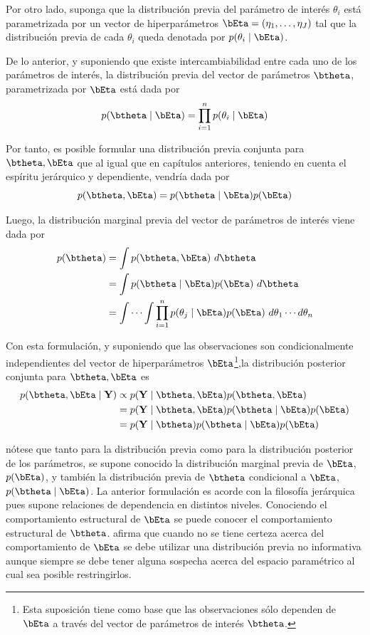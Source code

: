 \documentclass[10pt,openright]{book}\usepackage[]{graphicx}\usepackage[]{color}
\begin{document}
Por otro lado, suponga que la distribuci\'on previa del par\'ametro de inter\'es $\theta_i$ est\'a parametrizada por un vector de hiperpar\'ametros $\bEta=(\eta_1,\ldots,\eta_J)$ tal que la distribuci\'on previa de cada $\theta_i$ queda denotada por $p(\theta_i \mid \bEta)$.

De lo anterior, y suponiendo que existe intercambiabilidad entre cada uno de los par\'ametros de inter\'es, la distribuci\'on previa del vector de par\'ametros $\btheta$, parametrizada por $\bEta$ est\'a dada por
\begin{equation}
p(\btheta \mid \bEta)=\prod_{i=1}^n p(\theta_i \mid \bEta)
\end{equation}

Por tanto, es posible formular una distribuci\'on previa conjunta para $\btheta,\bEta$ que al igual que en cap\'itulos anteriores, teniendo en cuenta el esp\'iritu jer\'arquico y dependiente, vendr\'ia dada por
\begin{equation}
p(\btheta,\bEta)=p(\btheta \mid \bEta)p(\bEta)
\end{equation}

Luego, la distribuci\'on marginal previa del vector de par\'ametros de inter\'es viene dada por
\begin{align*}
p(\btheta)&=\int p(\btheta,\bEta) \ d\btheta\\
&=\int p(\btheta \mid \bEta)p(\bEta) \ d\btheta\\
&=\int \cdots \int \prod_{i=1}^n p(\theta_j \mid \bEta)p(\bEta) \ d\theta_1\cdots d\theta_n
\end{align*}

Con esta formulaci\'on, y suponiendo que las observaciones son condicionalmente independientes del vector de hiperpar\'ametros $\bEta$\footnote{Esta suposici\'on tiene como base que las observaciones s\'olo dependen de $\bEta$ a trav\'es del vector de par\'ametros de inter\'es $\btheta$.},la distribuci\'on posterior conjunta para $\btheta,\bEta$ es
\begin{align}\label{pos_theta_eta}
p(\btheta, \bEta \mid \mathbf{Y}) &\propto p(\mathbf{Y} \mid \btheta, \bEta)p(\btheta,\bEta)  \notag \\
&= p(\mathbf{Y} \mid \btheta, \bEta) p(\btheta \mid \bEta) p(\bEta)  \notag \\
&= p(\mathbf{Y} \mid \btheta) p(\btheta \mid \bEta) p(\bEta)
\end{align}

n\'otese que tanto para la distribuci\'on previa como para la distribuci\'on posterior de los par\'ametros, se supone conocido la distribuci\'on marginal previa de $\bEta$, $p(\bEta)$, y tambi\'en la distribuci\'on previa de $\btheta$ condicional a $\bEta$, $p(\btheta\mid\bEta)$. La anterior formulaci\'on es acorde con la filosof\'ia jer\'arquica pues supone relaciones de dependencia en distintos niveles. Conociendo el comportamiento estructural de $\bEta$ se puede conocer el comportamiento estructural de $\btheta$.  afirma que cuando no se tiene certeza acerca del comportamiento de $\bEta$ se debe utilizar una distribuci\'on previa no informativa aunque siempre se debe tener alguna sospecha acerca del espacio param\'etrico al cual sea posible restringirlos.
\end{document}
